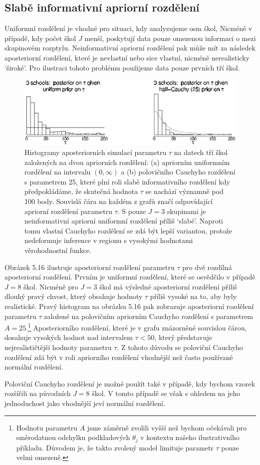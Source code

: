 \subsection{Slabě informativní apriorní rozdělení}

Uniformní rozdělení je vhodné pro situaci, kdy analyzujeme osm škol, Nicméně v případě, kdy počet škol $J$ menší, poskytují data pouze omezenou informaci o mezi skupinovém rozptylu. Neinformativní apriorní rozdělení pak může mít za následek aposteriorní rozdělení, které je nevlastní nebo sice vlastní, nicméně nerealisticky `široké'. Pro ilustraci tohoto problému použijeme data pouze prvních tří škol.

\begin{figure}[htp]
\centering
\includegraphics[scale = 0.42]{pictures/fig_5_10.eps}
\caption{Histogramy aposteriorních simulací parametru $\tau$ na datech tří škol založených na dvou apriorních rozdělení: (a) apriorním uniformním rozdělení na intervalu $(0, \infty)$ a (b) polovičního Cauchyho rozdělení s parametrem 25, které plní roli slabě informativního rozdělení kdy předpokládáme, že skutečná hodnota $\tau$ se nachází významně pod 100 body. Souvislá čára na každém z grafů značí odpovídající apriorní rozdělení parametru $\tau$. S pouze $J = 3$ skupinami je neinformativní apriorní uniformní rozdělení příliš `slabé'. Naproti tomu vlastní Cauchyho rozdělení se zdá být lepší variantou, protože nedeformuje inference v regionu s vysokými hodnotami věrohodnostní funkce.}
\label{fig_5_10}
\end{figure}

Obrázek 5.16 ilustruje aposteriorní rozdělení parametru $\tau$ pro dvě rozdílná aposteriorní rozdělení. Prvním je uniformní rozdělení, které se osvědčilo v případě $J = 8$ škol. Nicméně pro $J = 3$ škol má výsledné aposteriorní rozdělení příliš dlouhý pravý chvost, který obsahuje hodnoty $\tau$ příliš vysoké na to, aby byly realistické. Pravý histogram na obrázku 5.16 pak zobrazuje aposteriorní rozdělení parametru $\tau$ založené na polovičním apriorním Cauchyho rozdělení s parametrem $A = 25$.\footnote{Hodnotu parametru $A$ jsme záměrně zvolili vyšší než bychom očekávali pro směrodatnou odchylku podkladových $\theta_j$ v kontextu našeho ilustrativního příkladu. Důvodem je, že takto zvolený model limituje parametr $\tau$ pouze velmi omezeně.} Aposteriorního rozdělení, které je v grafu znázorněné souvislou čárou, dosahuje vysokých hodnot nad intervalem $\tau < 50$, který představuje nejrealističtější hodnoty parametru $\tau$. Z tohoto důvodu se poloviční Cauchyho rozdělení zdá být v roli apriorního rozdělení vhodnější než často používané normální rozdělení.

Poloviční Cauchyho rozdělení je možné použít také v případě, kdy bychom vzorek rozšířili na původních $J = 8$ škol. V tomto případě se však s ohledem na jeho jednoduchost jako vhodnější jeví normální rozdělení.